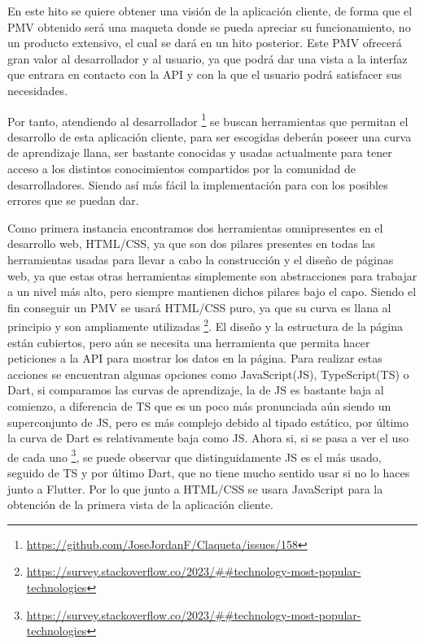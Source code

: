 En este hito se quiere obtener una visión de la aplicación cliente, de forma que el PMV obtenido será una maqueta 
donde se pueda apreciar su funcionamiento, no un producto extensivo, el cual se dará en un hito posterior. Este PMV 
ofrecerá gran valor al desarrollador y al usuario, ya que podrá dar una vista a la interfaz que entrara en contacto 
con la API y con la que el usuario podrá satisfacer sus necesidades.

Por tanto, atendiendo al desarrollador \footnote{\url{https://github.com/JoseJordanF/Claqueta/issues/158}} se buscan 
herramientas que permitan el desarrollo de esta aplicación cliente, para ser escogidas deberán poseer una curva de 
aprendizaje llana, ser bastante conocidas y usadas actualmente para tener acceso a los distintos conocimientos 
compartidos por la comunidad de desarrolladores. Siendo así más fácil la implementación para con los posibles errores 
que se puedan dar.

Como primera instancia encontramos dos herramientas omnipresentes en el desarrollo web, 
HTML\cite{WikiHtml}/CSS\cite{WikiCss}, ya que son dos pilares presentes en todas las herramientas usadas para llevar 
a cabo la construcción y el diseño de páginas web, ya que estas otras herramientas simplemente son abstracciones para 
trabajar a un nivel más alto, pero siempre mantienen dichos pilares bajo el capo. Siendo el fin conseguir un PMV se 
usará HTML/CSS puro, ya que su curva es llana al principio\cite{BookHtmlCss} y son ampliamente utilizadas
\footnote{\url{https://survey.stackoverflow.co/2023/##technology-most-popular-technologies}}. El diseño y la 
estructura de la página están cubiertos, pero aún se necesita una herramienta que permita hacer peticiones a la API 
para mostrar los datos en la página. Para realizar estas acciones se encuentran algunas opciones como 
JavaScript(JS)\cite{WhatIsJS}, TypeScript(TS)\cite{WhatIsTS} o Dart\cite{WhatIsDart}, si comparamos las curvas de 
aprendizaje, la de JS es bastante baja al comienzo, a diferencia de TS que es un poco más pronunciada aún siendo un 
superconjunto de JS, pero es más complejo debido al tipado estático, por último la curva de Dart es relativamente 
baja como JS. Ahora si, si se pasa a ver el uso de cada uno 
\footnote{\url{https://survey.stackoverflow.co/2023/##technology-most-popular-technologies}},
se puede observar que distinguidamente JS es el más usado, seguido de TS y por último Dart, que no tiene mucho 
sentido usar si no lo haces junto a Flutter. Por lo que junto a HTML/CSS se usara JavaScript para la obtención de la 
primera vista de la aplicación cliente.

